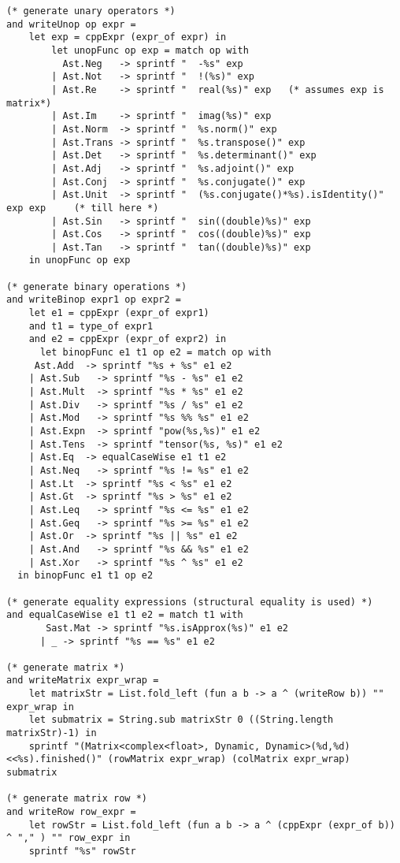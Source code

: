 \begin{lstlisting}
(* generate unary operators *)
and writeUnop op expr = 
    let exp = cppExpr (expr_of expr) in 
        let unopFunc op exp = match op with
          Ast.Neg   -> sprintf "  -%s" exp
        | Ast.Not   -> sprintf "  !(%s)" exp
        | Ast.Re    -> sprintf "  real(%s)" exp   (* assumes exp is matrix*)
        | Ast.Im    -> sprintf "  imag(%s)" exp
        | Ast.Norm  -> sprintf "  %s.norm()" exp
        | Ast.Trans -> sprintf "  %s.transpose()" exp
        | Ast.Det   -> sprintf "  %s.determinant()" exp
        | Ast.Adj   -> sprintf "  %s.adjoint()" exp
        | Ast.Conj  -> sprintf "  %s.conjugate()" exp
        | Ast.Unit  -> sprintf "  (%s.conjugate()*%s).isIdentity()" exp exp     (* till here *)
        | Ast.Sin   -> sprintf "  sin((double)%s)" exp
        | Ast.Cos   -> sprintf "  cos((double)%s)" exp
        | Ast.Tan   -> sprintf "  tan((double)%s)" exp
    in unopFunc op exp

(* generate binary operations *)
and writeBinop expr1 op expr2 = 
    let e1 = cppExpr (expr_of expr1) 
    and t1 = type_of expr1  
    and e2 = cppExpr (expr_of expr2) in 
      let binopFunc e1 t1 op e2 = match op with 
     Ast.Add  -> sprintf "%s + %s" e1 e2
    | Ast.Sub   -> sprintf "%s - %s" e1 e2
    | Ast.Mult  -> sprintf "%s * %s" e1 e2
    | Ast.Div   -> sprintf "%s / %s" e1 e2
    | Ast.Mod   -> sprintf "%s %% %s" e1 e2
    | Ast.Expn  -> sprintf "pow(%s,%s)" e1 e2
    | Ast.Tens  -> sprintf "tensor(%s, %s)" e1 e2
    | Ast.Eq  -> equalCaseWise e1 t1 e2
    | Ast.Neq   -> sprintf "%s != %s" e1 e2
    | Ast.Lt  -> sprintf "%s < %s" e1 e2
    | Ast.Gt  -> sprintf "%s > %s" e1 e2
    | Ast.Leq   -> sprintf "%s <= %s" e1 e2
    | Ast.Geq   -> sprintf "%s >= %s" e1 e2
    | Ast.Or  -> sprintf "%s || %s" e1 e2
    | Ast.And   -> sprintf "%s && %s" e1 e2
    | Ast.Xor   -> sprintf "%s ^ %s" e1 e2
  in binopFunc e1 t1 op e2 

(* generate equality expressions (structural equality is used) *)
and equalCaseWise e1 t1 e2 = match t1 with
       Sast.Mat -> sprintf "%s.isApprox(%s)" e1 e2
      | _ -> sprintf "%s == %s" e1 e2        

(* generate matrix *)
and writeMatrix expr_wrap = 
    let matrixStr = List.fold_left (fun a b -> a ^ (writeRow b)) "" expr_wrap in
    let submatrix = String.sub matrixStr 0 ((String.length matrixStr)-1) in
    sprintf "(Matrix<complex<float>, Dynamic, Dynamic>(%d,%d)<<%s).finished()" (rowMatrix expr_wrap) (colMatrix expr_wrap) submatrix

(* generate matrix row *)
and writeRow row_expr =
    let rowStr = List.fold_left (fun a b -> a ^ (cppExpr (expr_of b)) ^ "," ) "" row_expr in
    sprintf "%s" rowStr


\end{lstlisting}
